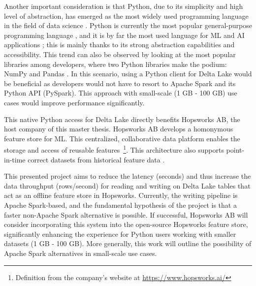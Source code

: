 Another important consideration is that Python, due to its simplicity and high level of abstraction, has emerged as the most widely used programming language in the field of data science \cite{nagpalPythonDataAnalytics2019}. Python is currently the most popular general-purpose programming language \cite{TIOBEIndex, StackOverflowDeveloper}, and it is by far the most used language for \gls{ML} and \gls{AI} applications \cite{python-machine-learning}; this is mainly thanks to its strong abstraction capabilities and accessibility. This trend can also be observed by looking at the most popular libraries among developers, where two Python libraries make the podium: NumPy and Pandas \cite{StackOverflowDeveloper}.
In this scenario, using a Python client for Delta Lake would be beneficial as developers would not have to resort to Apache Spark and its Python \gls{API} (PySpark). This approach with small-scale (1 GB - 100 GB) use cases would improve performance significantly.

This native Python access for Delta Lake directly benefits Hopsworks \gls{AB}, the host company of this master thesis. Hopsworks \gls{AB} develops a homonymous feature store for \gls{ML}. This centralized, collaborative data platform enables the storage and access of reusable features~\footnote{Definition from the company's website at \url{https://www.hopsworks.ai/}}. This architecture also supports point-in-time correct datasets from historical feature data \cite{Pettersson1695672}.

This presented project aims to reduce the latency (seconds) and thus increase the data throughput (rows/second) for reading and writing on Delta Lake tables that act as an offline feature store in Hopsworks. Currently, the writing pipeline is Apache Spark-based, and the fundamental hypothesis of the project is that a faster non-Apache Spark alternative is possible. If successful, Hopsworks AB will consider incorporating this system into the open-source Hopsworks feature store, significantly enhancing the experience for Python users working with smaller datasets (1 GB - 100 GB). More generally, this work will outline the possibility of Apache Spark alternatives in small-scale use cases.

